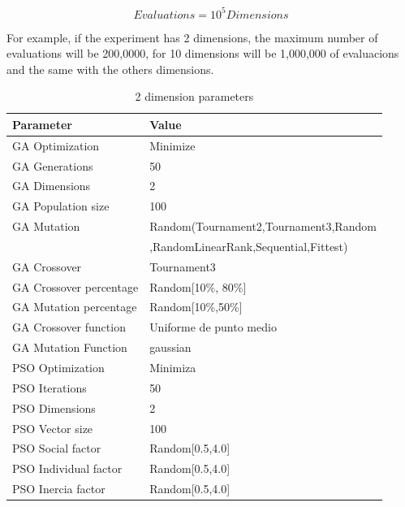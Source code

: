 \documentclass[runningheads]{llncs}
\begin{document}
\begin{equation}
    \label{eq:hesitancy-interpretation}
   Evaluations = 10^{5} Dimensions
   \end{equation}

For example, if the experiment has 2 dimensions, the maximum number of
evaluations will be 200,0000, for 10 dimensions will be 1,000,000 of evaluacions
and the same with the others dimensions.









   \begin{table}[htp]
    \caption{2 dimension parameters}
    \label{table:ga-pso-parameters-2}
    \centering
    \begin{tabular}{|l|l|}
    \hline
    Parameter & Value \\
    \hline
    \hline
    GA Optimization & Minimize \\
    \hline
    GA Generations & 50 \\
    \hline
    GA Dimensions & 2 \\
    \hline
    GA Population size & 100 \\
    \hline
    GA Mutation & Random(Tournament2,Tournament3,Random \\
    &  ,RandomLinearRank,Sequential,Fittest)\\
    \hline
    GA Crossover & Tournament3 \\
    \hline
    GA Crossover percentage & Random[10\%, 80\%] \\
    \hline
    GA Mutation percentage & Random[10\%,50\%] \\
    \hline
    GA Crossover function & Uniforme de punto medio \\
    \hline
    GA Mutation Function & gaussian \\
    \hline
    PSO Optimization & Minimiza \\
    \hline
    PSO Iterations & 50 \\
    \hline
    PSO Dimensions & 2 \\
    \hline
    PSO Vector size & 100 \\
    \hline
    PSO Social factor & Random[0.5,4.0] \\
    \hline
    PSO Individual factor & Random[0.5,4.0] \\
    \hline
    PSO Inercia factor & Random[0.5,4.0] \\
    \hline
    \end{tabular}
    \end{table}
\end{document}
